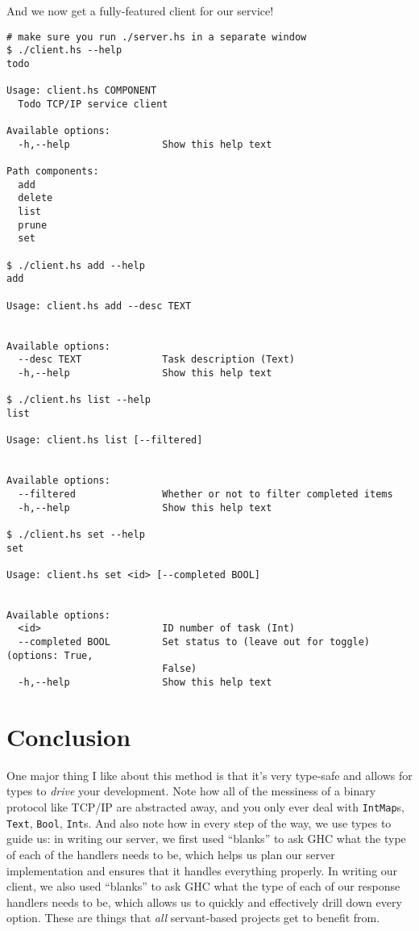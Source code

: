 \documentclass[]{article}
\begin{document}
And we now get a fully-featured client for our service!

\begin{verbatim}
# make sure you run ./server.hs in a separate window
$ ./client.hs --help
todo

Usage: client.hs COMPONENT
  Todo TCP/IP service client

Available options:
  -h,--help                Show this help text

Path components:
  add
  delete
  list
  prune
  set

$ ./client.hs add --help
add

Usage: client.hs add --desc TEXT


Available options:
  --desc TEXT              Task description (Text)
  -h,--help                Show this help text

$ ./client.hs list --help
list

Usage: client.hs list [--filtered]


Available options:
  --filtered               Whether or not to filter completed items
  -h,--help                Show this help text

$ ./client.hs set --help
set

Usage: client.hs set <id> [--completed BOOL]


Available options:
  <id>                     ID number of task (Int)
  --completed BOOL         Set status to (leave out for toggle) (options: True,
                           False)
  -h,--help                Show this help text
\end{verbatim}

\hypertarget{conclusion}{%
\section{Conclusion}\label{conclusion}}

One major thing I like about this method is that it's very type-safe and allows
for types to \emph{drive} your development. Note how all of the messiness of a
binary protocol like TCP/IP are abstracted away, and you only ever deal with
\texttt{IntMap}s, \texttt{Text}, \texttt{Bool}, \texttt{Int}s. And also note how
in every step of the way, we use types to guide us: in writing our server, we
first used ``blanks'' to ask GHC what the type of each of the handlers needs to
be, which helps us plan our server implementation and ensures that it handles
everything properly. In writing our client, we also used ``blanks'' to ask GHC
what the type of each of our response handlers needs to be, which allows us to
quickly and effectively drill down every option. These are things that
\emph{all} servant-based projects get to benefit from.
\end{document}
